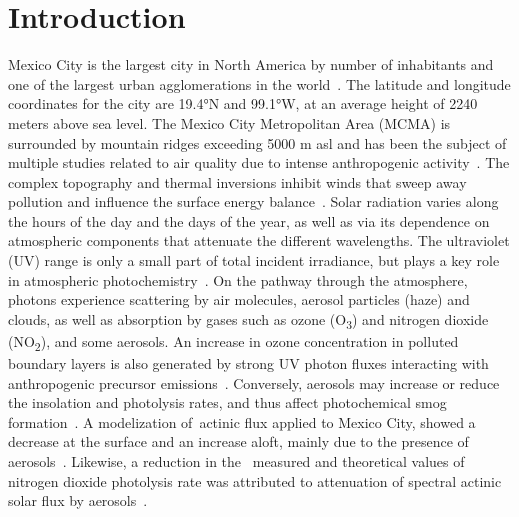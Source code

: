 \documentclass{article}
\begin{document}
\section*{Introduction}

Mexico City is the largest city in North America by number of
inhabitants and one of the largest urban agglomerations in the
world~\cite{2014a}. The latitude and longitude coordinates for the
city are 19.4°N and 99.1°W, at an average height of 2240 meters above
sea level. The Mexico City Metropolitan Area (MCMA) is surrounded by
mountain ridges exceeding 5000 m asl and has been the subject of
multiple studies related to air quality due to intense anthropogenic
activity~\cite{coauthors1998,Molina_2007,Molina_2010,Tzompa_Sosa_2017}. The complex topography and thermal
inversions inhibit winds that sweep away pollution and influence the
surface energy balance~\cite{Whiteman_2000,juregui-ostos2005,Zhang_2009}. Solar radiation varies along
the hours of the day and the days of the year, as well as via its
dependence on atmospheric components that attenuate the different
wavelengths. The ultraviolet (UV) range is only a small part of total
incident irradiance, but plays a key role in atmospheric
photochemistry~\cite{LEIGHTON_1961,pandis2016}. On the pathway through the
atmosphere, photons experience scattering by air molecules, aerosol
particles (haze) and clouds, as well as absorption by gases such as
ozone (O\textsubscript{3}) and nitrogen dioxide (NO\textsubscript{2}),
and some aerosols. An increase in ozone concentration in polluted
boundary layers is also generated by strong UV photon fluxes interacting
with anthropogenic precursor emissions~\cite{LEIGHTON_1961,Finlayson_Pitts_2000}. Conversely,
aerosols may increase or reduce the insolation and photolysis rates, and
thus affect photochemical smog formation~\cite{Dickerson_1997}. A
modelization of~actinic flux applied to Mexico City, showed a decrease
at the surface and an increase aloft, mainly due to the presence of
aerosols~\cite{Palancar_2012}. Likewise, a reduction in the~ measured and
theoretical values of nitrogen dioxide photolysis rate was attributed to
attenuation of spectral actinic solar flux by
aerosols~\cite{Castro_2001}.~
\end{document}
